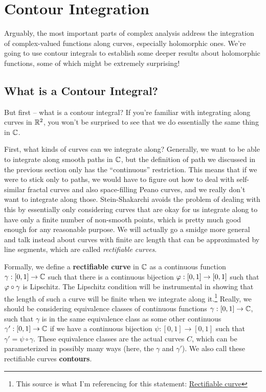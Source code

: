 \section{Contour Integration}

Arguably, the most important parts of complex analysis address the integration of complex-valued functions along curves, especially holomorphic ones. We're going to use contour integrals to establish some deeper results about holomorphic functions, some of which might be extremely surprising!

\subsection{What is a Contour Integral?}
But first -- what is a contour integral? If you're familiar with integrating along curves in $\mathbb R^2$, you won't be surprised to see that we do essentially the same thing in $\mathbb C$.

First, what kinds of curves can we integrate along? Generally, we want to be able to integrate along smooth paths in $\mathbb C$, but the definition of path we discussed in the previous section only has the ``continuous'' restriction. This means that if we were to stick only to paths, we would have to figure out how to deal with self-similar fractal curves and also space-filling Peano curves, and we really don't want to integrate along those. Stein-Shakarchi avoids the problem of dealing with this by essentially only considering curves that are okay for us integrate along to have only a finite number of non-smooth points, which is pretty much good enough for any reasonable purpose. We will actually go a smidge more general and talk instead about curves with finite arc length that can be approximated by line segments, which are called \textit{rectifiable curves}.

Formally, we define a \textbf{rectifiable curve} in $\mathbb C$ as a continuous function $\gamma : [0,1] \to \mathbb C$ such that there is a continuous bijection $\varphi : [0,1] \to [0,1]$ such that $\varphi \circ \gamma$ is Lipschitz. The Lipschitz condition will be instrumental in showing that the length of such a curve will be finite when we integrate along it.\footnote{This source is what I'm referencing for this statement: \href{https://encyclopediaofmath.org/wiki/Rectifiable_curve}{Rectifiable curve}} Really, we should be considering equivalence classes of continuous functions $\gamma : [0,1] \to \mathbb C$, such that $\gamma$ is in the same equivalence class as some other continuous $\gamma' : [0,1] \to \mathbb C$ if we have a continuous bijection $\psi : [0,1] \to [0,1]$ such that $\gamma' = \psi \circ \gamma$. These equivalence classes are the actual curves $C$, which can be parameterized in possibly many ways (here, the $\gamma$ and $\gamma'$). We also call these rectifiable curves \textbf{contours}.

